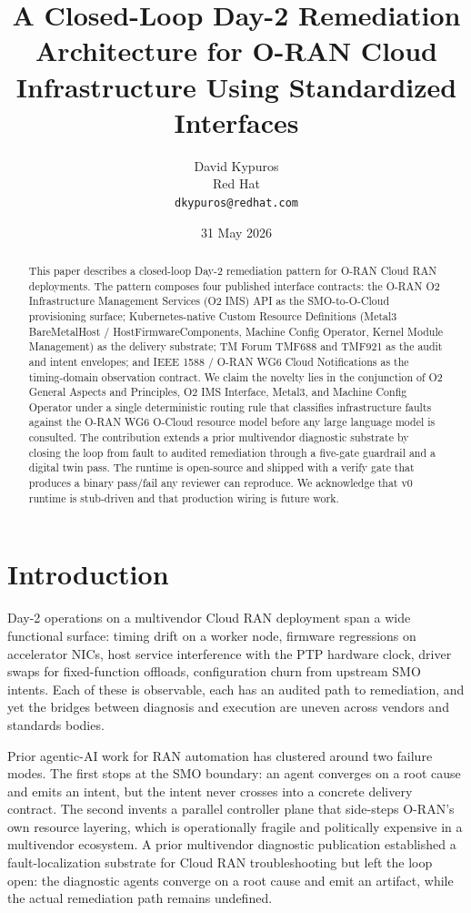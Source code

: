\documentclass[twocolumn,10pt,a4paper]{article}
\title{A Closed-Loop Day-2 Remediation Architecture for O-RAN Cloud Infrastructure Using Standardized Interfaces}
\author{David Kypuros \\
\small Red Hat \\
\small \texttt{dkypuros@redhat.com}}
\date{31 May 2026}
\begin{document}
\maketitle

\begin{abstract}
This paper describes a closed-loop Day-2 remediation pattern for O-RAN Cloud RAN deployments. The pattern composes four published interface contracts: the O-RAN O2 Infrastructure Management Services (O2 IMS) API as the SMO-to-O-Cloud provisioning surface; Kubernetes-native Custom Resource Definitions (Metal3 BareMetalHost / HostFirmwareComponents, Machine Config Operator, Kernel Module Management) as the delivery substrate; TM Forum TMF688 and TMF921 as the audit and intent envelopes; and IEEE 1588 / O-RAN WG6 Cloud Notifications as the timing-domain observation contract. We claim the novelty lies in the conjunction of O2 General Aspects and Principles, O2 IMS Interface, Metal3, and Machine Config Operator under a single deterministic routing rule that classifies infrastructure faults against the O-RAN WG6 O-Cloud resource model before any large language model is consulted. The contribution extends a prior multivendor diagnostic substrate by closing the loop from fault to audited remediation through a five-gate guardrail and a digital twin pass. The runtime is open-source and shipped with a verify gate that produces a binary pass/fail any reviewer can reproduce. We acknowledge that v0 runtime is stub-driven and that production wiring is future work.
\end{abstract}

\section{Introduction}

Day-2 operations on a multivendor Cloud RAN deployment span a wide functional surface: timing drift on a worker node, firmware regressions on accelerator NICs, host service interference with the PTP hardware clock, driver swaps for fixed-function offloads, configuration churn from upstream SMO intents. Each of these is observable, each has an audited path to remediation, and yet the bridges between diagnosis and execution are uneven across vendors and standards bodies.

Prior agentic-AI work for RAN automation has clustered around two failure modes. The first stops at the SMO boundary: an agent converges on a root cause and emits an intent, but the intent never crosses into a concrete delivery contract. The second invents a parallel controller plane that side-steps O-RAN's own resource layering, which is operationally fragile and politically expensive in a multivendor ecosystem. A prior multivendor diagnostic publication established a fault-localization substrate for Cloud RAN troubleshooting \cite{multivendor_blog_2026} but left the loop open: the diagnostic agents converge on a root cause and emit an artifact, while the actual remediation path remains undefined.
\end{document}
